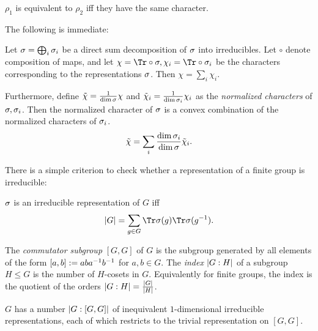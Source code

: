 \begin{fact}
	$\rho_1$ is equivalent to $\rho_2$ iff they have the same character. 
\end{fact}

The following is immediate:
\begin{lemma}\label{fact:character-convex-combination}
	Let $\sigma = \bigoplus_i \sigma_i$ be a direct sum decomposition of $\sigma$ into irreducibles. Let $\circ$ denote composition of maps, and let $\chi = \Tr\circ \s, \chi_i = \Tr\circ\s_i$ be the characters corresponding to the representations $\sigma$. Then $\chi = \sum_i \chi_i$. 

	Furthermore, define $\tilde \chi = \frac1{\dim \sigma}\chi$ and $\tilde\chi_i = \frac1{\dim \sigma_i} \chi_i$ as the \emph{normalized characters} of $\sigma,\sigma_i$. 
	Then the normalized character of $\sigma$ is a convex combination of the normalized characters of $\sigma_i$. 
	\begin{equation}
		\tilde \chi = \sum_i \frac{\dim \sigma_i}{\dim \sigma}\tilde\chi_i.
	\end{equation}
\end{lemma}

There is a simple criterion to check whether a representation of a finite group is irreducible:
\begin{fact}\label{fact:irreducibility-criterion}
	$\sigma$ is an irreducible representation of $G$ iff
	\begin{equation}
		\abs G = \sum_{g\in G} \Tr \s(g) \Tr\s(g\1). 
	\end{equation}
\end{fact}

\begin{definition}
	The \emph{commutator subgroup} $[G,G]$ of $G$ is the subgroup generated by all elements of the form $[a,b] := aba^{-1}b^{-1}$ for $a,b\in G$. The \emph{index} $\left\vert G:H\right\vert$ of a subgroup $H \leq G$ is the number of $H$-cosets in $G$. Equivalently for finite groups, the index is the quotient of the orders $\left\vert G:H\right\vert= \frac{\left\vert G\right\vert}{\left\vert H\right\vert}$.
\end{definition}

\begin{fact}\label{fact:1-dim-irreps}
	$G$ has a number $\left\vert G:[G,G]\right\vert$ of inequivalent $1$-dimensional irreducible representations, each of which restricts to the trivial representation on $[G,G]$.
\end{fact}

